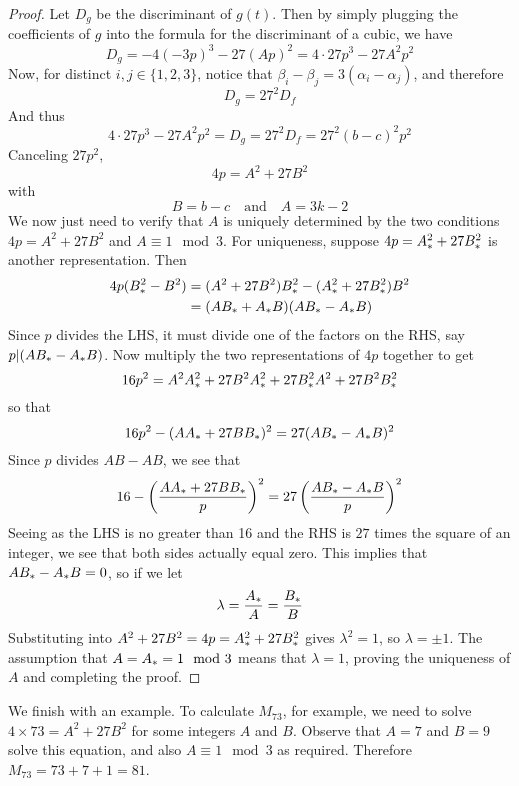 \begin{proof}
Let $D_g$ be the discriminant of $g(t)$.
Then by simply plugging the coefficients of $g$ into the formula for the discriminant of a cubic, we have
$$D_g = -4(-3p)^3 - 27(Ap)^2 = 4 \cdot 27p^3 - 27A^2p^2$$
Now, for distinct $i,j \in \{1,2,3\}$, notice that $\beta_i - \beta_j = 3(\alpha_i - \alpha_j)$, and therefore
$$D_g = 27^2 D_f$$
And thus
$$4 \cdot 27p^3 - 27A^2p^2 = D_g = 27^2 D_f = 27^2 (b-c)^2p^2$$
Canceling $27p^2$,
$$4p = A^2 + 27B^2$$
with
$$B = b-c\quad \text{and}\quad A = 3k-2$$
We now just need to verify that $A$ is uniquely determined by the two conditions $4p = A^2 + 27B^2$ and $A \equiv 1 \mod 3$.
For uniqueness, suppose $4p = {A}_{\ast}^2 + 27{B}_{\ast}^2$ is another representation.
Then
\begin{align*}
	4p(B_\ast^2 - B^2) &= (A^2 + 27B^2){B}_{\ast}^2 - ({A}_{\ast}^2 + 27{B}_{\ast}^2)B^2\\
	&= (A{B}_{\ast} + {A}_{\ast}B)(A{B}_{\ast} - {A}_{\ast}B)
\end{align*}
Since $p$ divides the LHS, it must divide one of the factors on the RHS, say $p|(A{B}_{\ast} - {A}_{\ast}B)$.
Now multiply the two representations of $4p$ together to get
$$16p^2 = A^2{A}_{\ast}^2 + 27B^2{A}_{\ast}^2 + 27{B}_{\ast}^2A^2 + 27B^2{B}_{\ast}^2$$
so that
$$16p^2 - (A{A}_{\ast} + 27B{B}_{\ast})^2 = 27(A{B}_{\ast} - {A}_{\ast}B)^2$$
Since $p$ divides $AB - AB$, we see that
$$16 - \left(\frac{A{A}_{\ast} + 27B{B}_{\ast}}{p}\right)^2 = 27\left(\frac{A{B}_{\ast}-{A}_{\ast}B}{p}\right)^2$$
Seeing as the LHS is no greater than 16 and the RHS is $27$ times the square of an integer, we see that both sides actually equal zero.
This implies that $A{B}_{\ast} - {A}_{\ast}B = 0$, so if we let
$$\lambda = \frac{{A}_{\ast}}{A} = \frac{{B}_{\ast}}{B}$$
Substituting into $A^2 + 27B^2 = 4p = {A}_{\ast}^2 + 27{B}_{\ast}^2$ gives $\lambda^2 = 1$, so $\lambda = \pm 1$.
The assumption that $A = {A}_{\ast} = 1 \mod 3$ means that $\lambda = 1$, proving the uniqueness of $A$ and completing the proof.
\end{proof}
We finish with an example.
To calculate $M_{73}$, for example, we need to solve $4\times73 = A^2 + 27B^2$ for some integers $A$ and $B$.
Observe that $A=7$ and $B=9$ solve this equation, and also $A\equiv 1 \mod 3$ as required.
Therefore $M_{73} = 73 + 7 + 1 = 81$.
